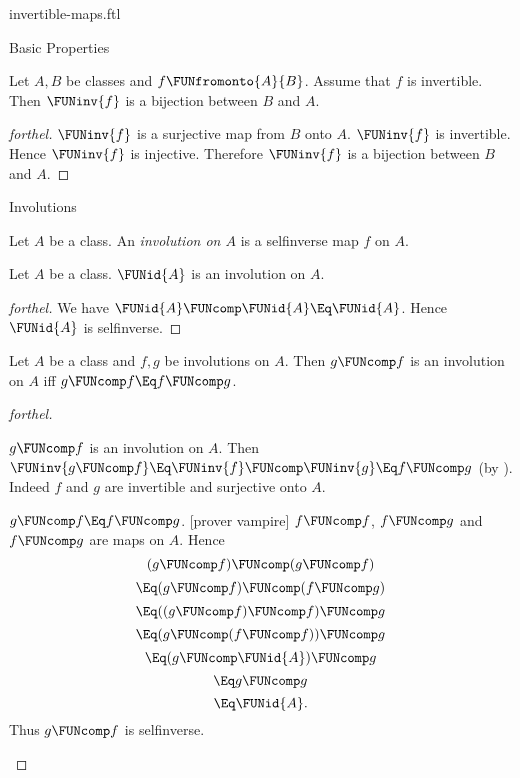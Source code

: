 \documentclass{stex}
\begin{document}
\begin{smodule}{invertible-maps.ftl}
\begin{sfragment}{Basic Properties}
  \begin{corollary}[forthel]
    Let $A, B$ be classes and $f \FUNfromonto{A}{B}$.
    Assume that $f$ is invertible.
    Then $\FUNinv{f}$ is a bijection between $B$ and $A$.
  \end{corollary}
  \begin{proof}[forthel]
    $\FUNinv{f}$ is a surjective map from $B$ onto $A$.
    $\FUNinv{f}$ is invertible.
    Hence $\FUNinv{f}$ is injective.
    Therefore $\FUNinv{f}$ is a bijection between $B$ and $A$.
  \end{proof}
\end{sfragment}

\begin{sfragment}{Involutions}
  \begin{definition}[forthel,for=involution]
    Let $A$ be a class.
    An \emph{involution on $A$} is a selfinverse map $f$ on $A$.
  \end{definition}

  \begin{proposition}[forthel]
    Let $A$ be a class.
    $\FUNid{A}$ is an involution on $A$.
  \end{proposition}
  \begin{proof}[forthel]
    We have $\FUNid{A} \FUNcomp \FUNid{A} \Eq \FUNid{A}$.
    Hence $\FUNid{A}$ is selfinverse.
  \end{proof}

  \begin{proposition}[forthel]
    Let $A$ be a class and $f, g$ be involutions on $A$.
    Then $g \FUNcomp f$ is an involution on $A$ iff $g \FUNcomp f \Eq f \FUNcomp g$.
  \end{proposition}
  \begin{proof}[forthel]
    \begin{case}{$g \FUNcomp f$ is an involution on $A$.}
      Then $\FUNinv{g \FUNcomp f}
        \Eq \FUNinv{f} \FUNcomp \FUNinv{g}
        \Eq f \FUNcomp g$
      (by ).
      Indeed $f$ and $g$ are invertible and surjective onto $A$.
    \end{case}

    \begin{case}{$g \FUNcomp f \Eq f \FUNcomp g$.}
      [prover vampire]
      $f \FUNcomp f$, $f \FUNcomp g$ and $f \FUNcomp g$ are maps on $A$.
      Hence
      \[  (g \FUNcomp f) \FUNcomp (g \FUNcomp f)       \]
      \[    \Eq (g \FUNcomp f) \FUNcomp (f \FUNcomp g)   \]
      \[    \Eq ((g \FUNcomp f) \FUNcomp f) \FUNcomp g   \]
      \[    \Eq (g \FUNcomp (f \FUNcomp f)) \FUNcomp g   \]
      \[    \Eq (g \FUNcomp \FUNid{A}) \FUNcomp g       \]
      \[    \Eq g \FUNcomp g                       \]
      \[    \Eq \FUNid{A}.                        \]
      Thus $g \FUNcomp f$ is selfinverse.
    \end{case}
  \end{proof}


\end{sfragment}
\end{smodule}
\end{document}
